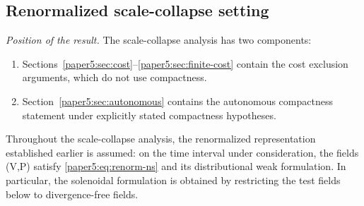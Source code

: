 \documentclass[11pt]{amsart}
\def\({}%
\def\){}%
\theoremstyle{plain}
\theoremstyle{definition}
\theoremstyle{remark}
\begin{document}
\subsection{Renormalized scale-collapse setting}

\medskip
\noindent\textit{Position of the result.}
The scale-collapse analysis has two components:
\begin{enumerate}[label=(\arabic*)]
  \item Sections~\ref{paper5:sec:cost}--\ref{paper5:sec:finite-cost} contain the cost
    exclusion arguments, which do not use compactness.
  \item Section~\ref{paper5:sec:autonomous} contains the autonomous compactness
    statement under explicitly stated compactness hypotheses.
\end{enumerate}

Throughout the scale-collapse analysis, the renormalized representation established earlier is assumed: on the
time interval under consideration, the fields \((V,P)\) satisfy \eqref{paper5:eq:renorm-ns} and its
distributional weak formulation.  In particular, the solenoidal formulation is obtained by
restricting the test fields below to divergence-free fields.
\end{document}
